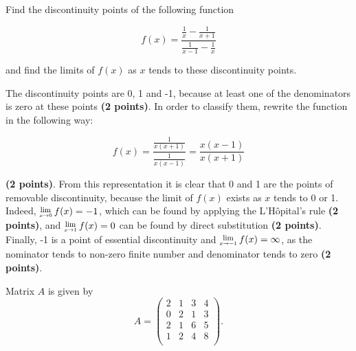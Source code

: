 \documentclass[addpoints]{exam} %
\newcommand{\Lim}[1]{\raisebox{0.5ex}{\scalebox{0.8}{$\displaystyle \lim_{#1}\;$}}}
\begin{document}
\begin{questions}
\question[10] Find the discontinuity points of the following function

\[
f(x) = \frac{\frac{1}{x}-\frac{1}{x+1}}{\frac{1}{x-1}-\frac{1}{x}}
\]

and find the limits of $f(x)$ as $x$ tends to these discontinuity points.

\begin{solution}

The discontinuity points are 0, 1 and -1, because at least one of the denominators is zero at these points \textbf{(2 points)}. In order to classify them, rewrite the function in the following way:

\[
f(x) = \frac{\frac{1}{x (x+1)}}{\frac{1}{x (x-1)}} = \frac{x (x-1)}{x (x+1)}
\]

\noindent \textbf{(2 points)}. From this representation it is clear that 0 and 1 are the points of removable discontinuity, because the limit of $f(x)$ exists as $x$ tends to 0 or 1. Indeed, $\Lim{x \rightarrow 0} f(x) = -1$, which can be found by applying the L'Hôpital's rule \textbf{(2 points)}, and $\Lim{x \rightarrow 1} f(x) = 0$ can be found by direct substitution \textbf{(2 points)}. Finally, -1 is a point of essential discontinuity and $\Lim{x \rightarrow -1} f(x) = \infty$, as the nominator tends to non-zero finite number and denominator tends to zero \textbf{(2 points)}.

\end{solution}




\question Matrix $A$ is given by
\[
A=\begin{pmatrix}
  2 & 1 & 3 & 4 \\
  0 & 2 & 1 & 3 \\
  2 & 1 & 6 & 5 \\
  1 & 2 & 4 & 8 \\
\end{pmatrix}.
\]

\end{questions}
\end{document}
